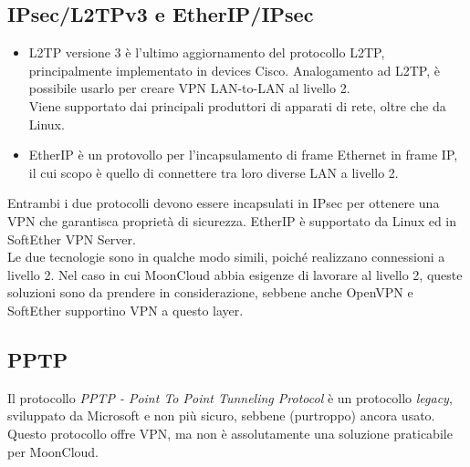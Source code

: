 	      
	      
	      \subsection{IPsec/L2TPv3 e EtherIP/IPsec}
	      \begin{itemize}
	      	\item L2TP versione 3 è l'ultimo aggiornamento del protocollo L2TP, principalmente implementato in
	      	      devices Cisco. Analogamento ad L2TP, è possibile usarlo per creare VPN LAN-to-LAN al livello 2.\\
	      	      Viene supportato dai principali produttori di apparati di rete, oltre che da Linux.
	      	\item EtherIP è un protovollo per l'incapsulamento di frame Ethernet in frame IP, il cui scopo è quello
	      	      di connettere tra loro diverse LAN a livello 2.
	      \end{itemize}
	      Entrambi i due protocolli devono essere incapsulati in IPsec per ottenere una VPN che garantisca proprietà
	      di sicurezza.
	      EtherIP è
	      supportato da Linux ed in SoftEther VPN Server.\\
	      Le due tecnologie sono in qualche modo simili, poiché realizzano connessioni a livello 2. Nel caso in cui
	      MoonCloud abbia esigenze di lavorare al livello 2, queste soluzioni sono da prendere in considerazione, sebbene
	      anche OpenVPN e SoftEther supportino VPN a questo layer.
	      
	      
	      \subsection{PPTP}
	      Il protocollo \textit{PPTP - Point To Point Tunneling Protocol} è un protocollo
	      \textit{legacy}, sviluppato da Microsoft e non più sicuro, sebbene (purtroppo)
	      ancora usato.
	      Questo protocollo offre VPN, ma non è assolutamente una soluzione praticabile per
	      MoonCloud.
